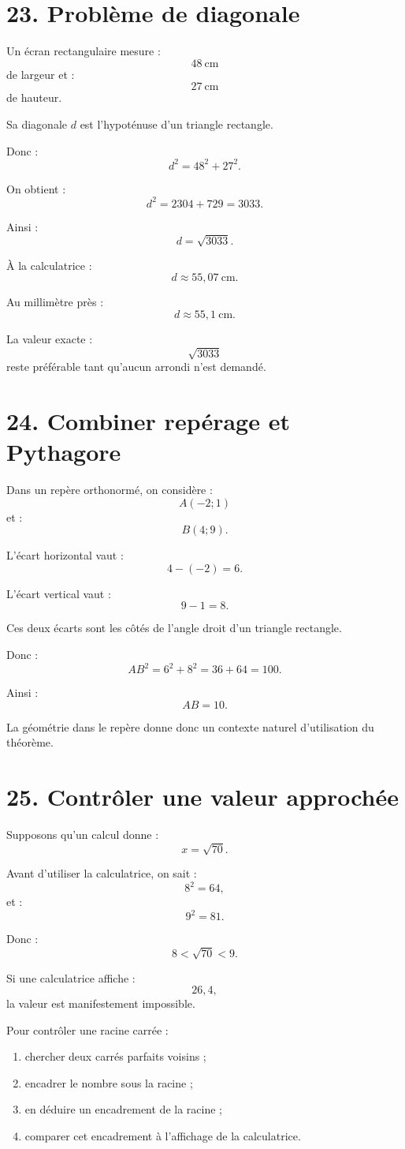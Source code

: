 \section{23. Problème de diagonale}

Un écran rectangulaire mesure :
\[
48\ \text{cm}
\]
de largeur et :
\[
27\ \text{cm}
\]
de hauteur.

Sa diagonale $d$ est l'hypoténuse d'un triangle rectangle.

Donc :
\[
d^2=48^2+27^2.
\]

On obtient :
\[
d^2=2304+729=3033.
\]

Ainsi :
\[
d=\sqrt{3033}.
\]

À la calculatrice :
\[
d\approx55{,}07\ \text{cm}.
\]

Au millimètre près :
\[
\boxed{d\approx55{,}1\ \text{cm}}.
\]

La valeur exacte :
\[
\sqrt{3033}
\]
reste préférable tant qu'aucun arrondi n'est demandé.

\section{24. Combiner repérage et Pythagore}

Dans un repère orthonormé, on considère :
\[
A(-2;1)
\]
et :
\[
B(4;9).
\]

L'écart horizontal vaut :
\[
4-(-2)=6.
\]

L'écart vertical vaut :
\[
9-1=8.
\]

Ces deux écarts sont les côtés de l'angle droit d'un triangle rectangle.

Donc :
\[
AB^2=6^2+8^2=36+64=100.
\]

Ainsi :
\[
\boxed{AB=10}.
\]

La géométrie dans le repère donne donc un contexte naturel d'utilisation du théorème.

\section{25. Contrôler une valeur approchée}

Supposons qu'un calcul donne :
\[
x=\sqrt{70}.
\]

Avant d'utiliser la calculatrice, on sait :
\[
8^2=64,
\]
et :
\[
9^2=81.
\]

Donc :
\[
8<\sqrt{70}<9.
\]

Si une calculatrice affiche :
\[
26{,}4,
\]
la valeur est manifestement impossible.

\begin{methode}
Pour contrôler une racine carrée :
\begin{enumerate}
\item chercher deux carrés parfaits voisins ;
\item encadrer le nombre sous la racine ;
\item en déduire un encadrement de la racine ;
\item comparer cet encadrement à l'affichage de la calculatrice.
\end{enumerate}
\end{methode}

